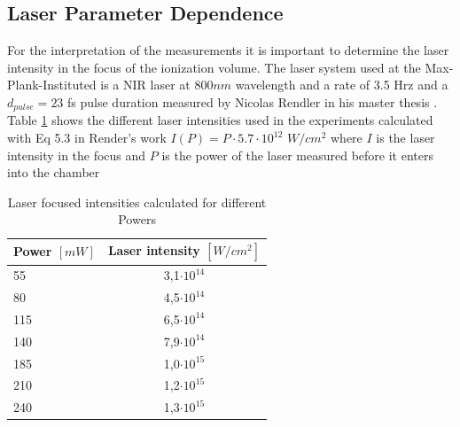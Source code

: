 \subsection{Laser Parameter Dependence}

For the interpretation of the measurements it is important to determine the laser intensity in the focus of the ionization volume. The laser system used at the Max-Plank-Instituted is a NIR laser at $800nm$ wavelength and a rate of 3.5 Hrz and a $d_{pulse}=23$ fs pulse duration measured by Nicolas Rendler in his master thesis \cite{rendler_einzelschuss_2017}. Table \ref{tab:nirintens} shows the different laser intensities used in the experiments calculated with Eq 5.3 in Render’s work \cite{rendler_einzelschuss_2017} $I(P)=P\cdot 5.7\cdot 10^{12}$ $W/cm^{2}$ where $I$ is the laser intensity in the focus and $P$ is the power of the laser measured before it enters into the chamber

\begin{table}[t]
\centering
\begin{tabular}{|l|c|}
\hline
\multicolumn{1}{|c|}{Power $[mW]$} & Laser intensity $[W/cm^{2}]$ \\ \hline
55                                  & 3,1$\cdot10^{14}$                                            \\ \hline
80                                  & 4,5$\cdot10^{14}$                                              \\ \hline
115                                 & 6,5$\cdot10^{14}$                                             \\ \hline
140                                 & 7,9$\cdot10^{14}$                                            \\ \hline
185                                 & 1,0$\cdot10^{15}$                                            \\ \hline
210                                 & 1,2$\cdot10^{15}$                                            \\ \hline
240                                 & 1,3$\cdot10^{15}$                                             \\ \hline
\end{tabular}
\caption[NIR laser power to intensities]{Laser focused intensities calculated for different Powers }
\label{tab:nirintens}
\end{table}



